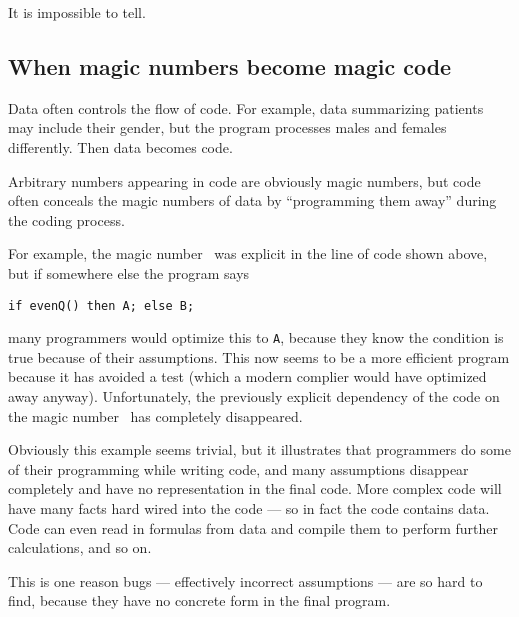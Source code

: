 \documentclass[10pt,a4paper]{article}
\begin{document}
It is impossible to tell. 

\subsection{When magic numbers become magic code}
Data often controls the flow of code. For example, data summarizing patients may include their gender, but the program processes males and females differently. Then data becomes code.

Arbitrary numbers appearing in code are obviously magic numbers, but code often conceals the magic numbers of data by ``programming them away'' during the coding process. 

For example, the magic number \the\magicNumber\ was explicit in the line of code shown above, but if somewhere else the program says

\begin{center}\texttt{if evenQ(\the\magicNumber) then A; else B;}\end{center}

many programmers would optimize this to \texttt{A}, because they know the condition is true because of their assumptions. This now seems to be a more efficient program because it has avoided a test (which a modern complier would have optimized away anyway). Unfortunately, the previously explicit dependency of the code on the magic number \the\magicNumber\ has completely disappeared.

Obviously this example seems trivial, but it illustrates that programmers do some of their programming while writing code, and many assumptions disappear completely and have no representation in the final code. More complex code will have many facts hard wired into the code --- so in fact the code contains data. Code can even read in formulas from data and compile them to perform further calculations, and so on.  

This is one reason bugs --- effectively incorrect assumptions --- are so hard to find, because they have no concrete form in the final program.
\end{document}

